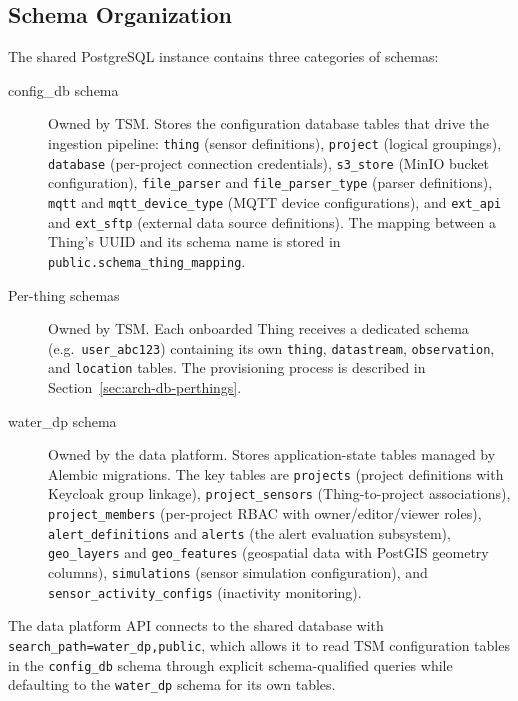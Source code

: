 \subsection{Schema Organization}
\label{sec:arch-db-shared}

The shared PostgreSQL instance contains three categories of schemas:

\begin{description}
  \item[config\_db schema] Owned by TSM. Stores the configuration database tables that
    drive the ingestion pipeline: \texttt{thing} (sensor definitions), \texttt{project}
    (logical groupings), \texttt{database} (per-project connection credentials),
    \texttt{s3\_store} (MinIO bucket configuration), \texttt{file\_parser} and
    \texttt{file\_parser\_type} (parser definitions), \texttt{mqtt} and
    \texttt{mqtt\_device\_type} (MQTT device configurations), and \texttt{ext\_api} and
    \texttt{ext\_sftp} (external data source definitions). The mapping between a Thing's
    UUID and its schema name is stored in \texttt{public.schema\_thing\_mapping}.

  \item[Per-thing schemas] Owned by TSM. Each onboarded Thing receives a dedicated schema
    (e.g.\ \texttt{user\_abc123}) containing its own \texttt{thing}, \texttt{datastream},
    \texttt{observation}, and \texttt{location} tables. The provisioning process is
    described in Section~\ref{sec:arch-db-perthings}.

  \item[water\_dp schema] Owned by the data platform. Stores application-state tables
    managed by Alembic migrations. The key tables are \texttt{projects} (project
    definitions with Keycloak group linkage), \texttt{project\_sensors} (Thing-to-project
    associations), \texttt{project\_members} (per-project RBAC with owner/editor/viewer
    roles), \texttt{alert\_definitions} and \texttt{alerts} (the alert evaluation
    subsystem), \texttt{geo\_layers} and \texttt{geo\_features} (geospatial data with
    PostGIS geometry columns), \texttt{simulations} (sensor simulation configuration),
    and \texttt{sensor\_activity\_configs} (inactivity monitoring).
\end{description}

The data platform API connects to the shared database with
\texttt{search\_path=water\_dp,public}, which allows it to read TSM configuration tables
in the \texttt{config\_db} schema through explicit schema-qualified queries while defaulting
to the \texttt{water\_dp} schema for its own tables.

